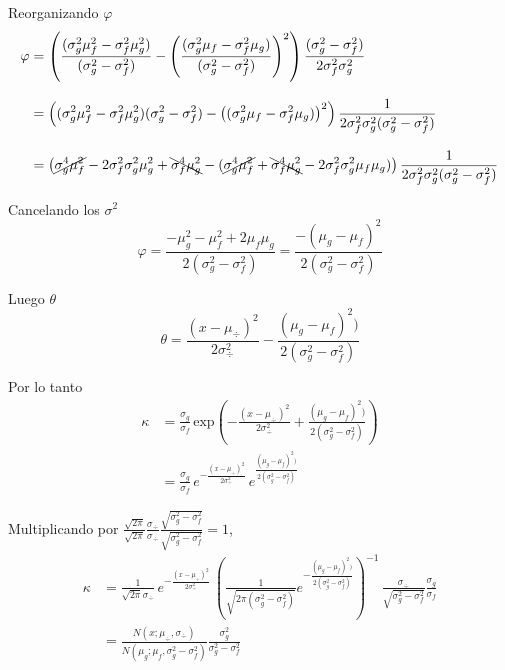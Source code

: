 \documentclass[article]{jss}
\begin{document}
\begin{appendix}
Reorganizando $\varphi$
\begin{equation}
\begin{split}
 \varphi & = \left( \frac{(\sigma_g^2\mu_f^2 - \sigma_f^2\mu_g^2)}{(\sigma_g^2 - \sigma_f^2)} - \left(\frac{(\sigma_g^2\mu_f - \sigma_f^2\mu_g)}{(\sigma_g^2 - \sigma_f^2)} \right)^2 \right) \frac{(\sigma_g^2 - \sigma_f^2)}{2\sigma_f^2\sigma_g^2} \\[0.3cm]
 & = \left((\sigma_g^2\mu_f^2 - \sigma_f^2\mu_g^2)(\sigma_g^2 - \sigma_f^2) - \left((\sigma_g^2\mu_f - \sigma_f^2\mu_g) \right)^2 \right) \frac{1}{2\sigma_f^2\sigma_g^2(\sigma_g^2 - \sigma_f^2)} \\[0.3cm]
 & =  \left( \cancel{\sigma_g^4\mu_f^2} - 2\sigma_f^2\sigma_g^2\mu_g^2 + \bcancel{\sigma_f^4\mu_g^2} - (\cancel{\sigma_g^4\mu_f^2} + \bcancel{\sigma_f^4\mu_g^2 } - 2\sigma_f^2\sigma_g^2\mu_f\mu_g)\right) \frac{1}{2\sigma_f^2\sigma_g^2(\sigma_g^2 - \sigma_f^2)}
 \end{split}
\end{equation}

Cancelando los $\sigma^2$
\begin{equation}
 \varphi = \frac{- \mu_g^2 - \mu_f^2 + 2\mu_f\mu_g}{2(\sigma_g^2 - \sigma_f^2)} = \frac{- (\mu_g - \mu_f)^2}{2(\sigma_g^2 - \sigma_f^2)}
\end{equation}

Luego $\theta$
\begin{equation}
 \theta = \frac{(x - \mu_{\div})^2}{2\sigma_{\div}^2} - \frac{(\mu_g - \mu_f)^2)}{2(\sigma_g^2 - \sigma_f^2)}
\end{equation}

Por lo tanto
\begin{equation}
\begin{split}
 \kappa & = \frac{\sigma_g}{\sigma_f}  \, \text{exp}\left(- \frac{(x - \mu_{\div})^2}{2\sigma_{\div}^2} + \frac{(\mu_g - \mu_f)^2)}{2(\sigma_g^2 - \sigma_f^2)}  \right)\\[0.3cm]
 & = \frac{\sigma_g}{\sigma_f} \, e^{-\frac{(x - \mu_{\div})^2}{2\sigma_{\div}^2}} \, e^{\frac{(\mu_g - \mu_f)^2)}{2(\sigma_g^2 - \sigma_f^2)}}
\end{split}
\end{equation}

Multiplicando por $\frac{\sqrt{2\pi}}{\sqrt{2\pi}}\frac{\sigma_{\div}}{\sigma_{\div}}\frac{\sqrt{\sigma_g^2 - \sigma_f^2}}{\sqrt{\sigma_g^2 - \sigma_f^2}}=1$,
\begin{equation}
\begin{split}
 \kappa & =  \frac{1}{\sqrt{2\pi}\sigma_{\div}} \, e^{-\frac{(x - \mu_{\div})^2}{2\sigma_{\div}^2}} \, \left( \frac
 {1}{\sqrt{2\pi(\sigma_g^2 - \sigma_f^2)} } e^{-\frac{(\mu_g - \mu_f)^2)}{2(\sigma_g^2 - \sigma_f^2)}} \right)^{-1} \, \frac{\sigma_{\div}}{\sqrt{\sigma_g^2 - \sigma_f^2}}\frac{\sigma_g}{\sigma_f}\\[0.3cm]
 & = \frac{N\left(x; \mu_{\div},\sigma_{\div}\right)}{N\left(\mu_g;\mu_f,\sigma_g^2-\sigma_f^2\right)} \frac{\sigma_g^2}{\sigma_g^2 - \sigma_f^2}
\end{split}
\end{equation}




\end{appendix}
\end{document}
